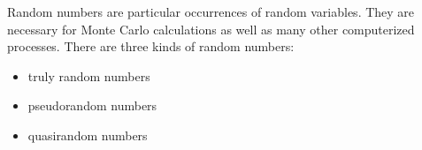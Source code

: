 \documentclass[12pt]{article}
\begin{document}
Random numbers are particular occurrences of random variables. They are necessary for Monte Carlo calculations as well as many other computerized processes.  There are three kinds of random numbers:

\begin{itemize}
\item truly random numbers
\item pseudorandom numbers
\item quasirandom numbers
\end{itemize}
\end{document}
